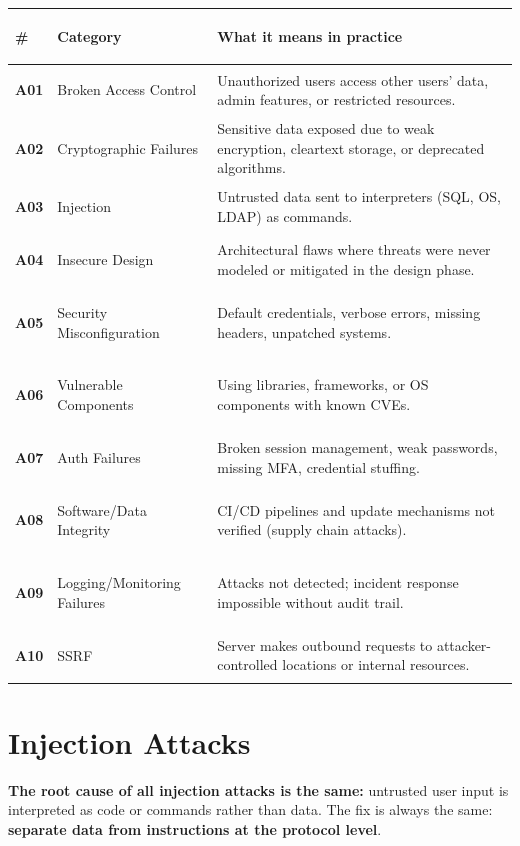 \documentclass[11pt, letterpaper]{article}
\begin{document}
\noindent
{\small\renewcommand{\arraystretch}{1.5}
\begin{tabularx}{\textwidth}{>{\bfseries\centering\arraybackslash}p{1cm}
                              >{\bfseries\raggedright\arraybackslash}p{4.5cm}
                              >{\raggedright\arraybackslash}X}
\toprule
\rowcolor{tableheaderred}
\textbf{\#} & \textbf{Category} & \textbf{What it means in practice} \\
\midrule
\rowcolor{rowRe} A01 & Broken Access Control   & Unauthorized users access other users' data, admin features, or restricted resources. \\
\rowcolor{rowA}  A02 & Cryptographic Failures  & Sensitive data exposed due to weak encryption, cleartext storage, or deprecated algorithms. \\
\rowcolor{rowRe} A03 & Injection               & Untrusted data sent to interpreters (SQL, OS, LDAP) as commands. \\
\rowcolor{rowA}  A04 & Insecure Design         & Architectural flaws where threats were never modeled or mitigated in the design phase. \\
\rowcolor{rowRe} A05 & Security Misconfiguration & Default credentials, verbose errors, missing headers, unpatched systems. \\
\rowcolor{rowA}  A06 & Vulnerable Components   & Using libraries, frameworks, or OS components with known CVEs. \\
\rowcolor{rowRe} A07 & Auth Failures           & Broken session management, weak passwords, missing MFA, credential stuffing. \\
\rowcolor{rowA}  A08 & Software/Data Integrity & CI/CD pipelines and update mechanisms not verified (supply chain attacks). \\
\rowcolor{rowRe} A09 & Logging/Monitoring Failures & Attacks not detected; incident response impossible without audit trail. \\
\rowcolor{rowA}  A10 & SSRF                    & Server makes outbound requests to attacker-controlled locations or internal resources. \\
\bottomrule
\end{tabularx}}

\section*{Injection Attacks}

\textbf{The root cause of all injection attacks is the same:} untrusted user input is interpreted as code or commands rather than data. The fix is always the same: \textbf{separate data from instructions at the protocol level}.
\end{document}
